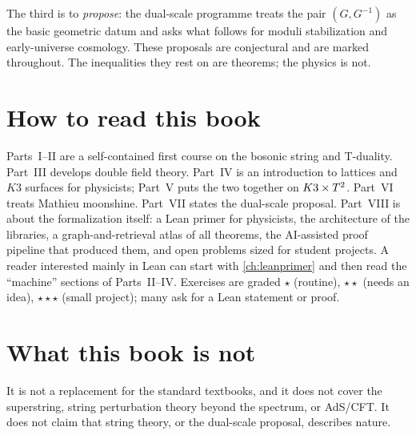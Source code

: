 The third is to \emph{propose}: the dual-scale programme treats the pair $(G,G^{-1})$ as the basic
geometric datum and asks what follows for moduli stabilization and early-universe cosmology. These
proposals are conjectural and are marked \TC{} throughout. The inequalities they rest on are theorems; the
physics is not.

\section*{How to read this book}
Parts~I--II are a self-contained first course on the bosonic string and T-duality. Part~III develops
double field theory. Part~IV is an introduction to lattices and $K3$ surfaces for physicists; Part~V puts
the two together on $K3\times T^2$. Part~VI treats Mathieu moonshine. Part~VII states the dual-scale proposal.
Part~VIII is about the formalization itself: a Lean primer for physicists, the architecture of the
libraries, a graph-and-retrieval atlas of all theorems, the AI-assisted proof pipeline that produced
them, and open problems sized for student projects. A reader interested mainly in Lean can start with
\cref{ch:leanprimer} and then read the ``machine'' sections of Parts~II--IV. Exercises are graded
$\star$ (routine), $\star\star$ (needs an idea), $\star\star\star$ (small project); many ask for a Lean
statement or proof.

\section*{What this book is not}
It is not a replacement for the standard textbooks, and it does not cover the superstring, string
perturbation theory beyond the spectrum, or AdS/CFT. It does not claim that string theory, or the
dual-scale proposal, describes nature.
